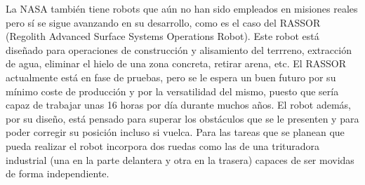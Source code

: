La NASA también tiene robots que aún no han sido empleados en misiones reales pero sí se sigue avanzando en su desarrollo, como es el caso del RASSOR (Regolith Advanced Surface Systems Operations Robot). Este robot está diseñado para operaciones de construcción y alisamiento del terrreno, extracción de agua, eliminar el hielo de una zona concreta, retirar arena, etc. El RASSOR actualmente está en fase de pruebas, pero se le espera un buen futuro por su mínimo coste de producción y por la versatilidad del mismo, puesto que sería capaz de trabajar unas 16 horas por día durante muchos años. El robot además, por su diseño, está pensado para superar los obstáculos que se le presenten y para poder corregir su posición incluso si vuelca. Para las tareas que se planean que pueda realizar el robot incorpora dos ruedas como las de una trituradora industrial (una en la parte delantera y otra en la trasera) capaces de ser movidas de forma independiente.
